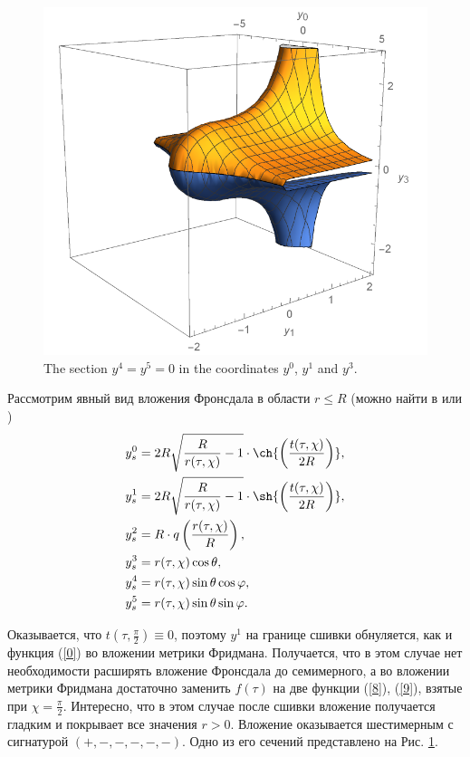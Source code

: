 \documentclass[12pt]{article}
\begin{document}
\begin{figure}[h!]
\begin{minipage}{0.45\linewidth}
	\includegraphics[width=1.1\linewidth]{Hole_with_matter_embedding.pdf}
	\caption{\label{pic_emb}The section $y^4 = y^5 = 0$ in the coordinates $ y^0 $, $ y^1 $ and $ y^3 $.}
\end{minipage}
\end{figure}

Рассмотрим явный вид вложения Фронсдала в области $r \leqslant R$ (можно найти в \cite{statja27,statja29} или \cite{frons})
\begin{align}
\label{8}	y^0_s & = 2 R \sqrt{\frac{R}{r(\tau, \chi)}-1} \cdot \ch{\left( \frac{t(\tau, \chi)}{2 R}\right)},  \\
	y^1_s & = 2 R \sqrt{\frac{R}{r(\tau, \chi)}-1} \cdot \sh{\left( \frac{t(\tau, \chi)}{2 R}\right)},  \\
\label{9}	y^2_s & = R \cdot q \left( \frac{r(\tau, \chi)}{R} \right), \\
	y^3_s &= r(\tau, \chi) \cos{\theta},  \\
	y^4_s &= r(\tau, \chi) \sin{\theta} \cos{\varphi},  \\
	y^5_s &= r(\tau, \chi) \sin{\theta} \sin{\varphi}.
\end{align}

Оказывается, что $t(\tau, \frac{\pi}{2}) \equiv 0$, поэтому $y^1$ на границе сшивки обнуляется, как и функция (\ref{0}) во вложении метрики Фридмана. Получается, что в этом случае нет необходимости расширять вложение Фронсдала до семимерного, а во вложении метрики Фридмана достаточно заменить $f(\tau)$ на две функции  (\ref{8}), (\ref{9}), взятые при $\chi = \frac{\pi}{2}$. Интересно, что в этом случае после сшивки вложение получается гладким и покрывает все значения $r>0$. Вложение оказывается шестимерным с сигнатурой $(+, -, -, -, -, -)$. Одно из его сечений представлено на Рис. \ref{pic_emb}.



\end{document}
